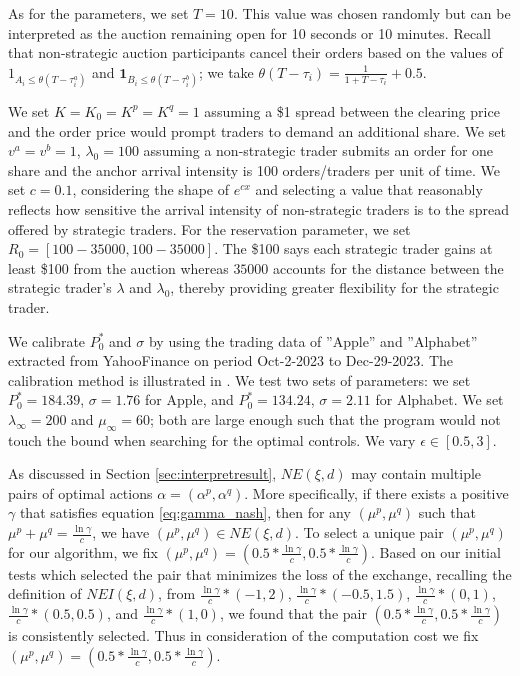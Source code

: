 \documentclass[12pt]{article}
\begin{document}
As for the parameters, we set $T = 10$. This value was chosen randomly but can be interpreted as the auction remaining open for 10 seconds or 10 minutes. Recall that non-strategic auction participants cancel their orders based on the values of $1_{A_i \leq \theta(T - \tau^a_i)}$ and $\mathbf 1_{B_i \leq \theta(T - \tau^b_i)}$; we take $\theta(T - \tau_i) = \frac{1}{1+T-\tau_i} + 0.5$.\vspace{0.5em}


We set $K = K_0 = K^p = K^q = 1$ assuming a \$1 spread between the clearing price and the order price would prompt traders to demand an additional share. We set $v^a =v^b =1$, $\lambda_0 = 100$ assuming a non-strategic trader submits an order for one share and the anchor arrival intensity is 100 orders/traders per unit of time. We set $c = 0.1$, considering the shape of $e^{cx}$ and selecting a value that reasonably reflects how sensitive the arrival intensity of non-strategic traders is to the spread offered by strategic traders. For the reservation parameter, we set $R_0 = [100- 35000,100- 35000]$. The \$100 says each strategic trader gains at least \$100 from the auction whereas $35000$ accounts for the distance between the strategic trader’s $\lambda$ and $\lambda_0$, thereby providing greater flexibility for the strategic trader.\vspace{0.5em}

We calibrate $P_0^*$ and $\sigma$ by using the trading data of ''Apple'' and ''Alphabet'' extracted from YahooFinance on period Oct-2-2023 to Dec-29-2023. The calibration method is illustrated in \cite[ Section 2.4]{mastrolia2024clearing}. We test two sets of parameters: we set $P_0^* = 184.39$, $\sigma = 1.76$ for Apple, and $P_0^* = 134.24$, $\sigma = 2.11$ for Alphabet. We set $\lambda_{\infty} = 200$ and $\mu_{\infty} = 60$; both are large enough such that the program would not touch the bound when searching for the optimal controls. We vary $\epsilon \in [0.5,3]$.  \vspace{0.5em}

As discussed in Section \ref{sec:interpretresult}, $NE(\xi,d)$ may contain multiple pairs of optimal actions $\alpha = (\alpha^p, \alpha^q)$. More specifically, if there exists a positive $\gamma$ that satisfies equation \eqref{eq:gamma_nash}, then for any $(\mu^p, \mu^q)$ such that $\mu^p + \mu^q = \frac{\ln \gamma}{c}$, we have  $(\mu^p, \mu^q) \in NE(\xi,d) $. To select a unique pair $(\mu^p, \mu^q)$ for our algorithm, we fix $(\mu^p, \mu^q) = (0.5*\frac{\ln \gamma}{c}, 0.5*\frac{\ln \gamma}{c})$. Based on our initial tests which selected the pair that minimizes the loss of the exchange, recalling the definition of $NEI(\xi,d)$, from $\frac{\ln \gamma}{c}* (-1, 2)$, $\frac{\ln \gamma}{c}* (-0.5, 1.5)$, $\frac{\ln \gamma}{c}* (0, 1)$, $\frac{\ln \gamma}{c}* (0.5, 0.5)$, and $\frac{\ln \gamma}{c}* (1, 0)$, we found that the pair $(0.5*\frac{\ln \gamma}{c}, 0.5*\frac{\ln \gamma}{c})$ is consistently selected. Thus in consideration of the computation cost we fix $(\mu^p, \mu^q) = (0.5*\frac{\ln \gamma}{c}, 0.5*\frac{\ln \gamma}{c})$.  \vspace{0.5em}
\end{document}
